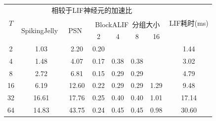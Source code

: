 \documentclass[10.5pt,compsoc,UTF8]{CjC}
\theoremstyle{mystyle}
\newcommand{\upcite}[1]{\textsuperscript{\cite{#1}}}
\begin{document}
\begin{multicols}{1}
\begin{table}[H]
	\vspace {-2.5mm}
	\begin{center}
		\begin{tabular}{c|cccccc|c}
			\hline
			\multicolumn{1}{c|}{\multirow{3}{*}{$T$}} & \multicolumn{6}{c|}{相较于LIF神经元的加速比}                                                                                     & \multirow{3}{*}{LIF耗时(ms)} \\ \cline{2-7}
			\multicolumn{1}{c|}{}                   & \multirow{2}{*}{SpikingJelly~\upcite{doi:10.1126/sciadv.adi1480}} & \multicolumn{1}{c|}{\multirow{2}{*}{PSN~\upcite{fang2023parallel}}} & \multicolumn{4}{c|}{BlockALIF~\upcite{NEURIPS2023_b9f253c2}分组大小}           &                            \\
			\multicolumn{1}{c|}{}                   &                               & \multicolumn{1}{c|}{}                     & 2    & 4    & 8    & \multicolumn{1}{c|}{16} &                            \\ \hline
			2                                       & 1.03                          & 2.20                                      & 0.20 &      &      &                         & 1.44                       \\
			4                                       & 1.48                          & 4.07                                      & 0.17 & 0.38 & 0.38 &                         & 3.02                       \\
			8                                       & 2.72                          & 6.81                                      & 0.15 & 0.29 & 0.29 &                         & 4.79                       \\
			16                                      & 6.19                          & 12.60                                     & 0.22 & 0.29 & 0.29 & 1.29                    & 9.48                       \\
			32                                      & 16.61                         & 17.76                                     & 0.25 & 0.40 & 0.40 & 1.01                    & 17.14                      \\
			64                                      & 14.83                         & 43.75                                     & 0.24 & 0.45 & 0.45 & 0.98                    & 30.60                      \\ \hline
			\hline                 
		\end{tabular}
		\label{tab: cmp speedup}
	\end{center}
\end{table}



\end{multicols}
\end{document}
